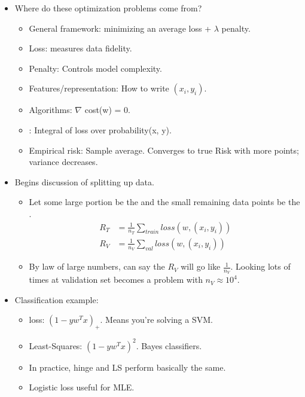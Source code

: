 \documentclass[12pt]{article}
\begin{document}
\begin{itemize}
	\item Where do these optimization problems come from?
	\begin{itemize}
		\item General framework: minimizing an average loss + $\lambda$ penalty.
		\item Loss: measures data fidelity.
		\item Penalty: Controls model complexity.
		\item Features/representation: How to write $(x_i, y_i)$.
		\item Algorithms: $\nabla$ cost(w) = 0.
		\item {}: Integral of loss over probability(x, y).
		\item Empirical risk: Sample average. Converges to true Risk with more points; variance decreases.
	\end{itemize}
	\item Begins discussion of splitting up data.
	\begin{itemize}
		\item Let some large portion be the  and the small remaining data points be the .
		\begin{align}
		R_T &= \frac{1}{n_T} \sum_{train} loss(w, (x_i, y_i)) \\
		R_V  &= \frac{1}{n_V} \sum_{val} loss(w, (x_i, y_i))
		\end{align}
		\item By law of large numbers, can say the $R_V$ will go like $\frac{1}{n_V}$. Looking lots of times at validation set becomes a problem with $n_V \approx 10^4$.
	\end{itemize}
	\item Classification example:
	\begin{itemize}
		\item {} loss: $(1 - y w^Tx)_+$. Means you're solving a SVM.
		\item Least-Squares:  $(1 - y w^Tx)^2$. Bayes classifiers.
		\item In practice, hinge and LS perform basically the same.
		\item Logistic loss useful for MLE.
	\end{itemize}

\end{itemize}
\end{document}
